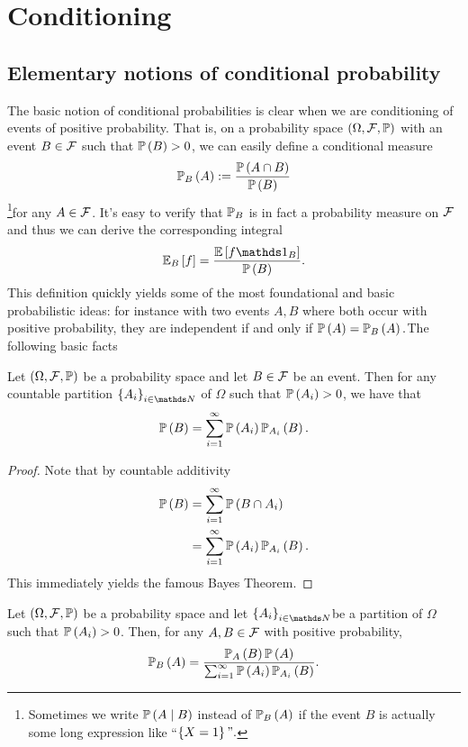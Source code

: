 
\chapter{Conditioning\label{chap:conditioning}}

\section{Elementary notions of conditional probability}

The basic notion of conditional probabilities is clear when we are
conditioning of events of positive probability. That is, on a probability
space $\probabilityspace$ with an event $B\in\F$ such that $\P\left(B\right)>0$,
we can easily define a conditional measure
\begin{equation}
\P_{B}\left(A\right):=\frac{\P\left(A\cap B\right)}{\P\left(B\right)}\label{eq:conditionalProbabilityPositive}
\end{equation}
\footnote{Sometimes we write $\P\left(A\mid B\right)$ instead of $\P_{B}\left(A\right)$
if the event $B$ is actually some long expression like ``$\left\{ X=1\right\} ".$}for any $A\in\F$. It's easy to verify that $\P_{B}$ is in fact a
probability measure on $\F$ and thus we can derive the corresponding
integral 
\[
\E_{B}\left[f\right]=\frac{\E\left[f\indicate_{B}\right]}{\P\left(B\right)}.
\]
This definition quickly yields some of the most foundational and basic
probabilistic ideas: for instance with two events $A,B$ where both
occur with positive probability, they are independent if and only
if $\P\left(A\right)=\P_{B}\left(A\right).$The following basic facts
\begin{lem}
\label{lem:totalProbability}Let $\probabilityspace$ be a probability
space and let $B\in\F$ be an event. Then for any countable partition
$\left\{ A_{i}\right\} _{i\in\N}$ of $\Omega$ such that $\P\left(A_{i}\right)>0$,
we have that 
\[
\P\left(B\right)=\sum_{i=1}^{\infty}\P\left(A_{i}\right)\P_{A_{i}}\left(B\right).
\]
\end{lem}

\begin{proof}
Note that by countable additivity
\begin{align*}
\P\left(B\right) & =\sum_{i=1}^{\infty}\P\left(B\cap A_{i}\right)\\
 & =\sum_{i=1}^{\infty}\P\left(A_{i}\right)\P_{A_{i}}\left(B\right).
\end{align*}
This immediately yields the famous Bayes Theorem.
\end{proof}
\begin{thm}
\label{thm:bayesTheorem}Let $\probabilityspace$ be a probability
space and let $\left\{ A_{i}\right\} _{i\in\N}$be a partition of
$\Omega$ such that $\P\left(A_{i}\right)>0$. Then, for any $A,B\in\F$
with positive probability,
\[
\P_{B}\left(A\right)=\frac{\P_{A}\left(B\right)\P\left(A\right)}{\sum_{i=1}^{\infty}\P\left(A_{i}\right)\P_{A_{i}}\left(B\right)}.
\]
\end{thm}

